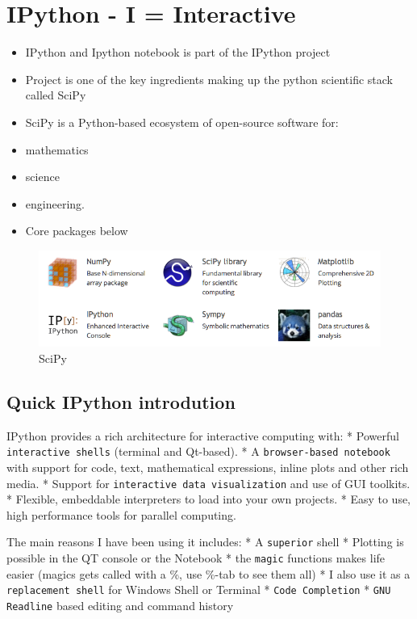 \documentclass{article}
\begin{document}
    \section{IPython - I = Interactive}

\begin{itemize}
\itemsep1pt\parskip0pt
\item
  IPython and Ipython notebook is part of the IPython project
\item
  Project is one of the key ingredients making up the python scientific
  stack called SciPy
\item
  SciPy is a Python-based ecosystem of open-source software for:
\item
  mathematics
\item
  science
\item
  engineering.
\item
  Core packages below
\end{itemize}

\begin{figure}[htbp]
\centering
\includegraphics{scistack.png}
\caption{SciPy}
\end{figure}

    \subsection{Quick IPython introdution}

IPython provides a rich architecture for interactive computing with: *
Powerful \texttt{interactive shells} (terminal and Qt-based). * A
\texttt{browser-based notebook} with support for code, text,
mathematical expressions, inline plots and other rich media. * Support
for \texttt{interactive data visualization} and use of GUI toolkits. *
Flexible, embeddable interpreters to load into your own projects. * Easy
to use, high performance tools for parallel computing.

The main reasons I have been using it includes: * A \texttt{superior}
shell * Plotting is possible in the QT console or the Notebook * the
\texttt{magic} functions makes life easier (magics gets called with a
\%, use \%-tab to see them all) * I also use it as a
\texttt{replacement shell} for Windows Shell or Terminal *
\texttt{Code Completion} * \texttt{GNU Readline} based editing and
command history
\end{document}
